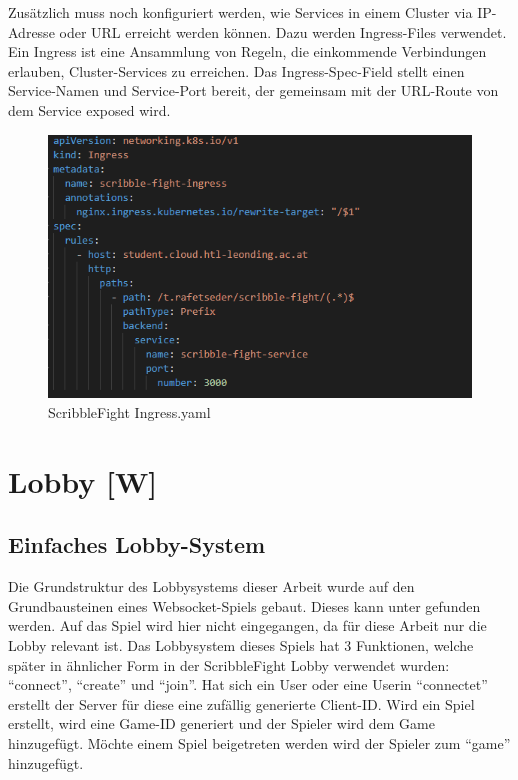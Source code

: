 Zusätzlich muss noch konfiguriert werden, wie Services in einem Cluster via IP-Adresse oder URL erreicht werden können.
Dazu werden Ingress-Files verwendet. Ein Ingress ist eine Ansammlung von Regeln, die einkommende Verbindungen erlauben, Cluster-Services zu erreichen.
Das Ingress-Spec-Field stellt einen Service-Namen und Service-Port bereit, der gemeinsam mit der URL-Route von dem Service exposed wird.

\begin{figure}[H]
    \centering
    \includegraphics[scale=0.85]{pics/ingress.PNG}
    \caption{ScribbleFight Ingress.yaml}
\end{figure}





\section{Lobby [W]}
\subsection{Einfaches Lobby-System}
Die Grundstruktur des Lobbysystems dieser Arbeit wurde auf den
Grundbausteinen eines Websocket-Spiels gebaut.
Dieses kann unter \cite{gameLobby} 
gefunden werden. Auf das Spiel wird hier nicht eingegangen, da für
diese Arbeit nur die Lobby relevant ist. Das Lobbysystem dieses Spiels hat 3 Funktionen, welche später in ähnlicher Form in der ScribbleFight Lobby verwendet wurden: ``connect'', ``create'' und ``join''.
Hat sich ein User oder eine Userin ``connectet'' erstellt der Server für diese eine zufällig generierte Client-ID.
Wird ein Spiel erstellt, wird eine Game-ID generiert und der Spieler wird dem Game hinzugefügt.
Möchte einem Spiel beigetreten werden wird der Spieler zum ``game'' hinzugefügt.

